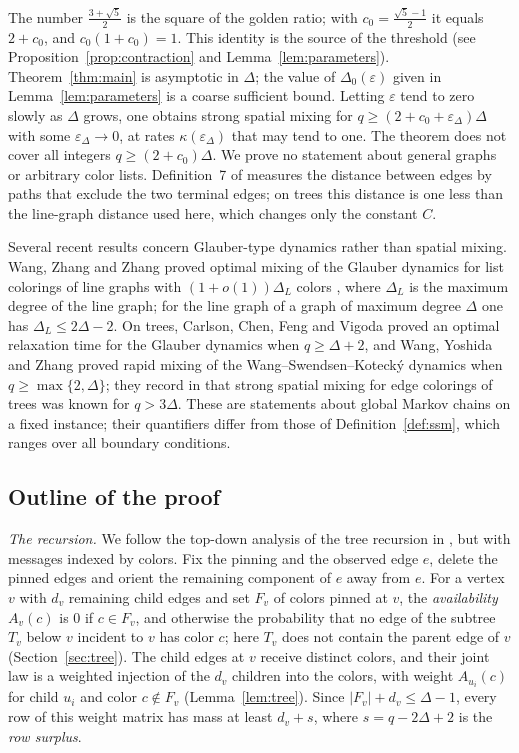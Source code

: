 \documentclass{amsart}
\numberwithin{equation}{section}
\theoremstyle{plain}
\theoremstyle{definition}
\theoremstyle{remark}
\begin{document}
The number $\frac{3+\sqrt5}{2}$ is the square of the golden ratio; with $c_0=\frac{\sqrt5-1}{2}$ it equals $2+c_0$, and $c_0(1+c_0)=1$. This identity is the source of the threshold (see Proposition~\ref{prop:contraction} and Lemma~\ref{lem:parameters}). Theorem~\ref{thm:main} is asymptotic in $\Delta$; the value of $\Delta_0(\varepsilon)$ given in Lemma~\ref{lem:parameters} is a coarse sufficient bound. Letting $\varepsilon$ tend to zero slowly as $\Delta$ grows, one obtains strong spatial mixing for $q\ge(2+c_0+\varepsilon_\Delta)\Delta$ with some $\varepsilon_\Delta\to0$, at rates $\kappa(\varepsilon_\Delta)$ that may tend to one. The theorem does not cover all integers $q\ge(2+c_0)\Delta$. We prove no statement about general graphs or arbitrary color lists. Definition~7 of \cite{CWZZ} measures the distance between edges by paths that exclude the two terminal edges; on trees this distance is one less than the line-graph distance used here, which changes only the constant $C$.

Several recent results concern Glauber-type dynamics rather than spatial mixing. Wang, Zhang and Zhang \cite{WZZ} proved optimal mixing of the Glauber dynamics for list colorings of line graphs with $(1+o(1))\Delta_L$ colors \cite[Theorem~24]{WZZ}, where $\Delta_L$ is the maximum degree of the line graph; for the line graph of a graph of maximum degree $\Delta$ one has $\Delta_L\le2\Delta-2$. On trees, Carlson, Chen, Feng and Vigoda \cite[Theorem~1]{CCFV} proved an optimal relaxation time for the Glauber dynamics when $q\ge\Delta+2$, and Wang, Yoshida and Zhang \cite[Theorem~1.8 and Corollary~1.10]{WYZ} proved rapid mixing of the Wang--Swendsen--Koteck\'y dynamics when $q\ge\max\{2,\Delta\}$; they record in \cite[Remark~1.11]{WYZ} that strong spatial mixing for edge colorings of trees was known for $q>3\Delta$. These are statements about global Markov chains on a fixed instance; their quantifiers differ from those of Definition~\ref{def:ssm}, which ranges over all boundary conditions.

\subsection{Outline of the proof}

\emph{The recursion.} We follow the top-down analysis of the tree recursion in \cite{CWZZ}, but with messages indexed by colors. Fix the pinning and the observed edge $e$, delete the pinned edges and orient the remaining component of $e$ away from $e$. For a vertex $v$ with $d_v$ remaining child edges and set $F_v$ of colors pinned at $v$, the \emph{availability} $A_v(c)$ is $0$ if $c\in F_v$, and otherwise the probability that no edge of the subtree $T_v$ below $v$ incident to $v$ has color $c$; here $T_v$ does not contain the parent edge of $v$ (Section~\ref{sec:tree}). The child edges at $v$ receive distinct colors, and their joint law is a weighted injection of the $d_v$ children into the colors, with weight $A_{u_i}(c)$ for child $u_i$ and color $c\notin F_v$ (Lemma~\ref{lem:tree}). Since $|F_v|+d_v\le\Delta-1$, every row of this weight matrix has mass at least $d_v+s$, where $s=q-2\Delta+2$ is the \emph{row surplus}.
\end{document}
